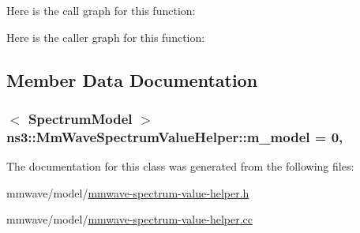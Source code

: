 Here is the call graph for this function\+:




Here is the caller graph for this function\+:




\subsection{Member Data Documentation}
\subsubsection[{\texorpdfstring{m\+\_\+model}{m_model}}]{$<$ {\bf Spectrum\+Model} $>$ ns3\+::\+Mm\+Wave\+Spectrum\+Value\+Helper\+::m\+\_\+model = 0\hspace{0.3cm}{\ttfamily [static]}, {\ttfamily [private]}}\hypertarget{classns3_1_1MmWaveSpectrumValueHelper_acc22bc3ad1571c328d808ccaf2c56a09}{}\label{classns3_1_1MmWaveSpectrumValueHelper_acc22bc3ad1571c328d808ccaf2c56a09}


The documentation for this class was generated from the following files\+:\begin{DoxyCompactItemize}
\item 
mmwave/model/\hyperlink{mmwave-spectrum-value-helper_8h}{mmwave-\/spectrum-\/value-\/helper.\+h}\item 
mmwave/model/\hyperlink{mmwave-spectrum-value-helper_8cc}{mmwave-\/spectrum-\/value-\/helper.\+cc}\end{DoxyCompactItemize}

